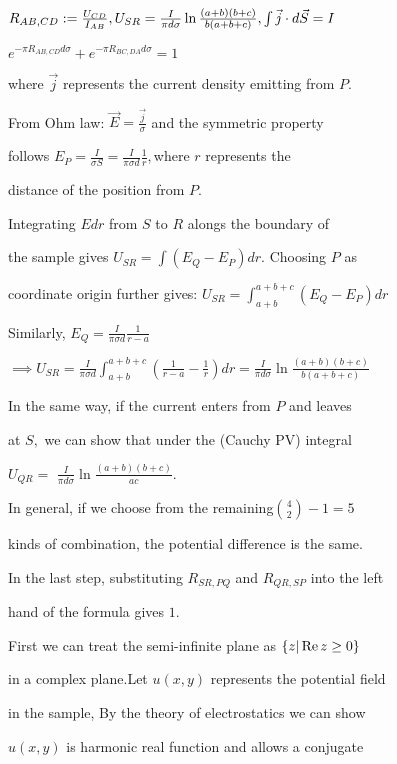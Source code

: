 \documentclass{ctexart}
\def\func#1{\mathop{\rm #1}}%
\begin{document}
$R_{AB,CD}:=\frac{U_{CD}}{I_{AB}},U_{SR}=\frac{I}{\pi d\sigma }\ln \frac{%
\left( a+b\right) \left( b+c\right) }{b\left( a+b+c\right) },\int \vec{j}%
\cdot d\vec{S}=I$

$e^{-\pi R_{AB,CD}d\sigma }+e^{-\pi R_{BC,DA}d\sigma }=1$

where $\vec{j}$ represents the current density emitting from $P.$

From Ohm law: $\vec{E}=\frac{\vec{j}}{\sigma }$ and the symmetric property

follows $E_{P}=\frac{I}{\sigma S}=\frac{I}{\pi \sigma d}\frac{1}{r},$where $%
r $ represents the

distance of the position from $P.$

Integrating $Edr$ from $S$ to $R$ alongs the boundary of

the sample gives $U_{SR}=\int \left( E_{Q}-E_{P}\right) dr.$ Choosing $P$ as

coordinate origin further gives: $U_{SR}=\int_{a+b}^{a+b+c}\left(
E_{Q}-E_{P}\right) dr$

Similarly, $E_{Q}=\frac{I}{\pi \sigma d}\frac{1}{r-a}$

$\implies U_{SR}=\frac{I}{\pi \sigma d}\int_{a+b}^{a+b+c}\left( \frac{1}{r-a}%
-\frac{1}{r}\right) dr=\frac{I}{\pi d\sigma }\ln \frac{\left( a+b\right)
\left( b+c\right) }{b\left( a+b+c\right) }$

In the same way, if the current enters from $P$ and leaves

at $S,$ we can show that under the (Cauchy PV) integral

$U_{QR}=$ $\frac{I}{\pi d\sigma }\ln \frac{\left( a+b\right) \left(
b+c\right) }{ac}.$

In general, if we choose from the remaining$\binom{4}{2}-1=5$

kinds of combination, the potential difference is the same.

In the last step, substituting $R_{SR,PQ}$ and $R_{QR,SP}$ into the left

hand of the formula gives $1.$

\bigskip

First we can treat the semi-infinite plane as $\left\{ z|\func{Re}z\geq
0\right\} $

in a complex plane.Let $u\left( x,y\right) $ represents the potential field

in the sample, By the theory of electrostatics we can show

$u\left( x,y\right) $ is harmonic real function and allows a conjugate
\end{document}
